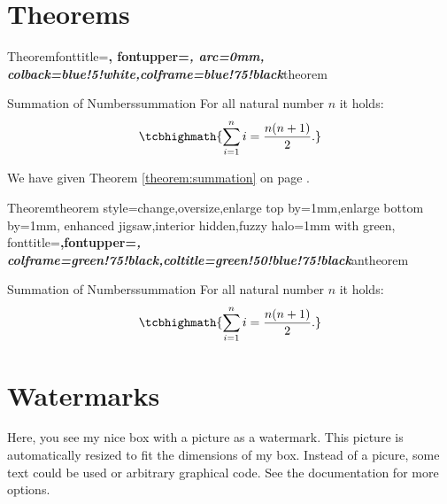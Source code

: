 \section{Theorems}

%
  {Theorem}{fonttitle=\bfseries\upshape, fontupper=\slshape,
     arc=0mm, colback=blue!5!white,colframe=blue!75!black}{theorem}

\begin{theo}{Summation of Numbers}{summation}
  For all natural number $n$ it holds:
  \begin{equation}
  \tcbhighmath{\sum\limits_{i=1}^n i = \frac{n(n+1)}{2}.}
  \end{equation}
\end{theo}

We have given Theorem \ref{theorem:summation} on page \pageref{theorem:summation}.

%
  {Theorem}{theorem style=change,oversize,enlarge top by=1mm,enlarge bottom by=1mm,
    enhanced jigsaw,interior hidden,fuzzy halo=1mm with green,
     fonttitle=\bfseries\upshape,fontupper=\slshape,
     colframe=green!75!black,coltitle=green!50!blue!75!black}{antheorem}

\begin{antheo}{Summation of Numbers}{summation}
  For all natural number $n$ it holds:
  \begin{equation}
  \tcbhighmath{\sum\limits_{i=1}^n i = \frac{n(n+1)}{2}.}
  \end{equation}
\end{antheo}

\section{Watermarks}

\begin{tcolorbox}[enhanced,watermark graphics=Basilica_5.png,
  watermark opacity=0.3,watermark zoom=0.9,
  colback=green!5!white,colframe=green!75!black,
  fonttitle=\bfseries, title=Box with a watermark picture]
  Here, you see my nice box with a picture as a watermark.
  This picture is automatically resized to fit the dimensions
  of my box. Instead of a picure, some text could be used or
  arbitrary graphical code. See the documentation for more options.
\end{tcolorbox}

